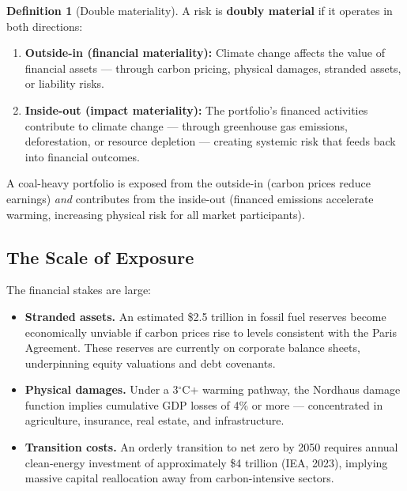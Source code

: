 \documentclass[11pt, a4paper]{article}
\theoremstyle{definition}
\newtheorem{definition}{Definition}[section]
\theoremstyle{plain}
\theoremstyle{remark}
\begin{document}
\begin{definition}[Double materiality]\label{def:double-materiality}
A risk is \textbf{doubly material} if it operates in both directions:
\begin{enumerate}
    \item \textbf{Outside-in (financial materiality):} Climate change affects the
          value of financial assets --- through carbon pricing, physical damages,
          stranded assets, or liability risks.
    \item \textbf{Inside-out (impact materiality):} The portfolio's financed
          activities contribute to climate change --- through greenhouse gas
          emissions, deforestation, or resource depletion --- creating systemic
          risk that feeds back into financial outcomes.
\end{enumerate}
\end{definition}

A coal-heavy portfolio is exposed from the outside-in (carbon prices reduce
earnings) \emph{and} contributes from the inside-out (financed emissions
accelerate warming, increasing physical risk for all market participants).

\subsection{The Scale of Exposure}

The financial stakes are large:
\begin{itemize}
    \item \textbf{Stranded assets.} An estimated \$2.5 trillion in fossil fuel
          reserves become economically unviable if carbon prices rise to levels
          consistent with the Paris Agreement.
          These reserves are currently on corporate balance sheets, underpinning
          equity valuations and debt covenants.
    \item \textbf{Physical damages.} Under a 3$^\circ$C+ warming pathway, the
          Nordhaus damage function implies cumulative GDP losses of 4\% or more ---
          concentrated in agriculture, insurance, real estate, and infrastructure.
    \item \textbf{Transition costs.} An orderly transition to net zero by 2050
          requires annual clean-energy investment of approximately \$4 trillion
          (IEA, 2023), implying massive capital reallocation away from
          carbon-intensive sectors.
\end{itemize}
\end{document}
